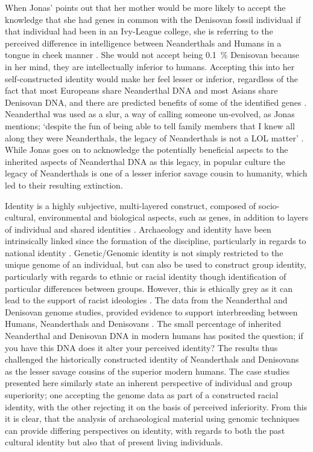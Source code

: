 When Jonas’ points out that her mother would be more likely to accept the knowledge that she had genes in common with the Denisovan fossil individual if that individual had been in an Ivy-League college, she is referring to the perceived difference in intelligence between Neanderthals and Humans in a tongue in cheek manner \parencite{Jonas_2014}. She would not accept being \SI{0.1}{\percent} Denisovan because in her mind, they are intellectually inferior to humans. Accepting this into her self-constructed identity would make her feel lesser or inferior, regardless of the fact that most Europeans share Neanderthal DNA and most Asians share Denisovan DNA, and there are predicted benefits of some of the identified genes \parencite{Vernot_2014}. Neanderthal was used as a slur, a way of calling someone un-evolved, as Jonas mentions; ‘despite the fun of being able to tell family members that I knew all along they were Neanderthals, the legacy of Neanderthals is not a LOL matter’ \parencite{Jonas_2014}. While Jonas goes on to acknowledge the potentially beneficial aspects to the inherited aspects of Neanderthal DNA as this legacy, in popular culture the legacy of Neanderthals is one of a lesser inferior savage cousin to humanity, which led to their resulting extinction.


Identity is a highly subjective, multi-layered construct, composed of socio-cultural, environmental and biological aspects, such as genes, in addition to layers of individual and shared identities \parencite{Zeiler_2007}. Archaeology and identity have been intrinsically linked since the formation of the discipline, particularly in regards to national identity \parencite{Meskell_2002}. Genetic/Genomic identity is not simply restricted to the unique genome of an individual, but can also be used to construct group identity, particularly with regards to ethnic or racial identity though identification of particular differences between groups. However, this is ethically grey as it can lead to the support of racist ideologies \parencite{Carter_2007}. The data from the Neanderthal and Denisovan genome studies, provided evidence to support interbreeding between Humans, Neanderthals and Denisovans \parencites{Sankararaman_2012}{Sankararaman_2014}{Meyer_2012}. The small percentage of inherited Neanderthal and Denisovan DNA in modern humans has posited the question; if you have this DNA does it alter your perceived identity? The results thus challenged the historically constructed identity of Neanderthals and Denisovans as the lesser savage cousins of the superior modern humans. The case studies presented here similarly state an inherent perspective of individual and group superiority; one accepting the genome data as part of a constructed racial identity, with the other rejecting it on the basis of perceived inferiority. From this it is clear, that the analysis of archaeological material using genomic techniques can provide differing perspectives on identity, with regards to both the past cultural identity but also that of present living individuals. 

